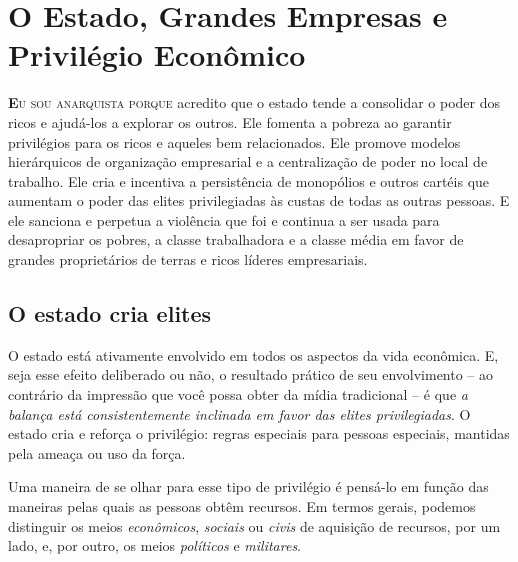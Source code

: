 
\chapter{O Estado, Grandes Empresas e Privilégio Econômico}
\label{chap:3}

\lettrine[lines=2]{\textcolor{LettrineColor}{\textbf{E}}}{u sou anarquista porque} acredito que o estado tende a consolidar o poder dos ricos e ajudá-los a explorar os outros. Ele fomenta a pobreza ao garantir privilégios para os ricos e aqueles bem relacionados. Ele promove modelos hierárquicos de organização empresarial e a centralização de poder no local de trabalho. Ele cria e incentiva a persistência de monopólios e outros cartéis que aumentam o poder das elites privilegiadas às custas de todas as outras pessoas. E ele sanciona e perpetua a violência que foi e continua a ser usada para desapropriar os pobres, a classe trabalhadora e a classe média em favor de grandes proprietários de terras e ricos líderes empresariais.

\section{O estado cria elites}

O estado está ativamente envolvido em todos os aspectos da vida econômica. E, seja esse efeito deliberado ou não, o resultado prático de seu envolvimento -- ao contrário da impressão que você possa obter da mídia tradicional -- é que \emph{a balança está consistentemente inclinada em favor das elites privilegiadas}. O estado cria e reforça o privilégio: regras especiais para pessoas especiais, mantidas pela ameaça ou uso da força.

Uma maneira de se olhar para esse tipo de privilégio é pensá-lo em função das maneiras pelas quais as pessoas obtêm recursos. Em termos gerais, podemos distinguir os meios \emph{econômicos}, \emph{sociais} ou \emph{civis} de aquisição de recursos, por um lado, e, por outro, os meios \emph{políticos} e \emph{militares}.

